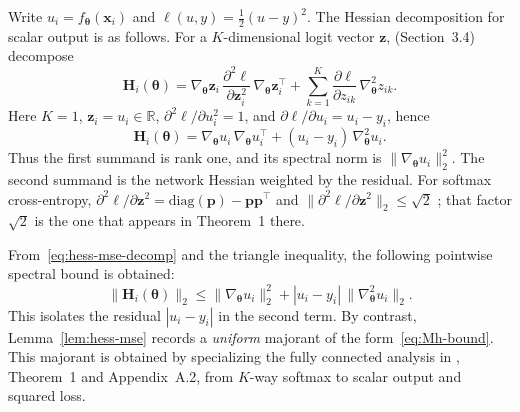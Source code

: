\documentclass[10pt,letterpaper]{article}
\theoremstyle{definition}
\begin{document}
Write $u_i=f_{\boldsymbol{\theta}}(\mathbf{x}_i)$ and $\ell(u,y)=\tfrac{1}{2}(u-y)^2$. The Hessian decomposition for scalar output is as follows.
For a $K$-dimensional logit vector $\mathbf{z}$, \cite{kiselev2024hessian} (Section~3.4) decompose
\[
  \mathbf{H}_i(\boldsymbol{\theta})
  = \nabla_{\boldsymbol{\theta}}\mathbf{z}_i\,\frac{\partial^2\ell}{\partial\mathbf{z}_i^2}\,\nabla_{\boldsymbol{\theta}}\mathbf{z}_i^{\top}
  + \sum_{k=1}^{K}\frac{\partial\ell}{\partial z_{ik}}\,\nabla_{\boldsymbol{\theta}}^2 z_{ik}.
\]
Here $K=1$, $\mathbf{z}_i=u_i\in\mathbb{R}$, $\partial^2\ell/\partial u_i^2=1$, and $\partial\ell/\partial u_i=u_i-y_i$, hence
\begin{equation}\label{eq:hess-mse-decomp}
  \mathbf{H}_i(\boldsymbol{\theta})
  = \nabla_{\boldsymbol{\theta}}u_i\,\nabla_{\boldsymbol{\theta}}u_i^{\top}
  + (u_i-y_i)\,\nabla_{\boldsymbol{\theta}}^2 u_i .
\end{equation}
Thus the first summand is rank one, and its spectral norm is $\|\nabla_{\boldsymbol{\theta}}u_i\|_2^2$. The second summand is the network Hessian weighted by the residual.
For softmax cross-entropy, $\partial^2\ell/\partial\mathbf{z}^2=\mathrm{diag}(\mathbf{p})-\mathbf{p}\mathbf{p}^{\top}$ and $\|\partial^2\ell/\partial\mathbf{z}^2\|_2\le\sqrt{2}$ \cite{kiselev2024hessian}; that factor $\sqrt{2}$ is the one that appears in Theorem~1 there.

From~\eqref{eq:hess-mse-decomp} and the triangle inequality, the following pointwise spectral bound is obtained:
\begin{equation}\label{eq:hess-mse-triangle}
  \bigl\|\mathbf{H}_i(\boldsymbol{\theta})\bigr\|_2
  \le \bigl\|\nabla_{\boldsymbol{\theta}}u_i\bigr\|_2^2
  + |u_i-y_i|\,\bigl\|\nabla_{\boldsymbol{\theta}}^2 u_i\bigr\|_2 .
\end{equation}
This isolates the residual $|u_i-y_i|$ in the second term. By contrast, Lemma~\ref{lem:hess-mse} records a \emph{uniform} majorant of the form~\eqref{eq:Mh-bound}. This majorant is obtained by specializing the fully connected analysis in \cite{kiselev2024hessian}, Theorem~1 and Appendix~A.2, from $K$-way softmax to scalar output and squared loss.
\end{document}
